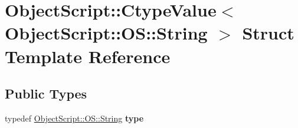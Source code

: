 \hypertarget{struct_object_script_1_1_ctype_value_3_01_object_script_1_1_o_s_1_1_string_01_4}{}\section{Object\+Script\+:\+:Ctype\+Value$<$ Object\+Script\+:\+:OS\+:\+:String $>$ Struct Template Reference}
\label{struct_object_script_1_1_ctype_value_3_01_object_script_1_1_o_s_1_1_string_01_4}
\subsection*{Public Types}
\begin{DoxyCompactItemize}
\item 
typedef \hyperlink{class_object_script_1_1_o_s_1_1_string}{Object\+Script\+::\+O\+S\+::\+String} {\bfseries type}\hypertarget{struct_object_script_1_1_ctype_value_3_01_object_script_1_1_o_s_1_1_string_01_4_aa696737c0b638d32ebf844c7c445774d}{}\label{struct_object_script_1_1_ctype_value_3_01_object_script_1_1_o_s_1_1_string_01_4_aa696737c0b638d32ebf844c7c445774d}

\end{DoxyCompactItemize}
